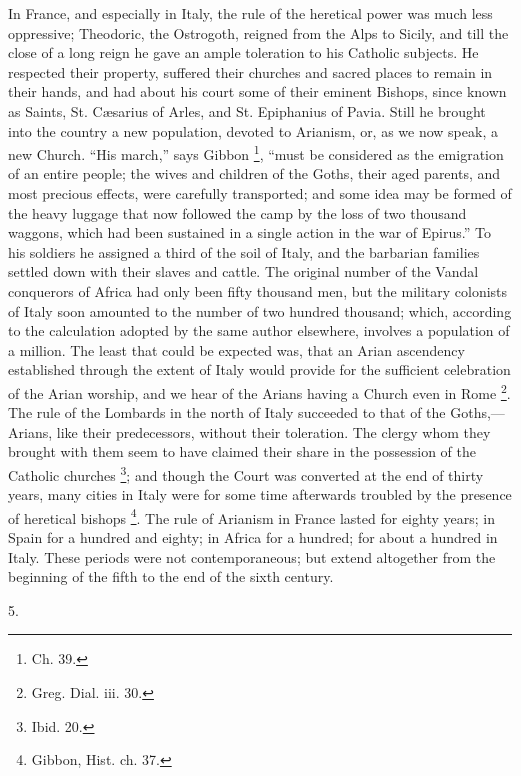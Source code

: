 In France, and especially in Italy, the rule of the heretical power
was much less oppressive; Theodoric, the Ostrogoth, reigned from the
Alps to Sicily, and till the close of a long reign he gave an ample
toleration to his Catholic subjects. He respected their property,
suffered their churches and sacred places to remain in their hands,
and had about his court some of their eminent Bishops, since known as
Saints, St. Cæsarius of Arles, and St. Epiphanius of Pavia. Still he
brought into the country a new population, devoted to Arianism, or, as
we now speak, a new Church. ``His march,'' says Gibbon \footnote{Ch. 39.}, ``must be considered as the emigration of an entire people; the wives and children of the Goths, their aged parents, and
most precious effects, were carefully transported; and some idea may
be formed of the heavy luggage that now followed the camp by the loss
of two thousand waggons, which had been sustained in a single action
in the war of Epirus.'' To his soldiers he assigned a third of the
soil of Italy, and the barbarian families settled down with their
slaves and cattle. The original number of the Vandal conquerors of
Africa had only been fifty thousand men, but the military colonists of
Italy soon amounted to the number of two hundred thousand; which,
according to the calculation adopted by the same author elsewhere,
involves a population of a million. The least that could be expected
was, that an Arian ascendency established through the extent of Italy
would provide for the sufficient celebration of the Arian worship, and
we hear of the Arians having a Church even in Rome \footnote{Greg. Dial. iii. 30.}. The rule of the Lombards in the north of Italy succeeded to
that of the Goths,—Arians, like their predecessors, without their
toleration. The clergy whom they brought with them seem to have
claimed their share in the possession of the Catholic churches \footnote{Ibid. 20.}; and though the Court was converted at the end of thirty
years, many cities in Italy were for some time afterwards troubled by
the presence of heretical bishops \footnote{Gibbon, Hist. ch. 37.}. The rule of Arianism in France lasted for eighty years; in
Spain for a hundred and eighty; in Africa for a hundred; for about a
hundred in Italy. These periods were not contemporaneous; but extend
altogether from the beginning of the fifth to the end of the sixth
century.

5.

